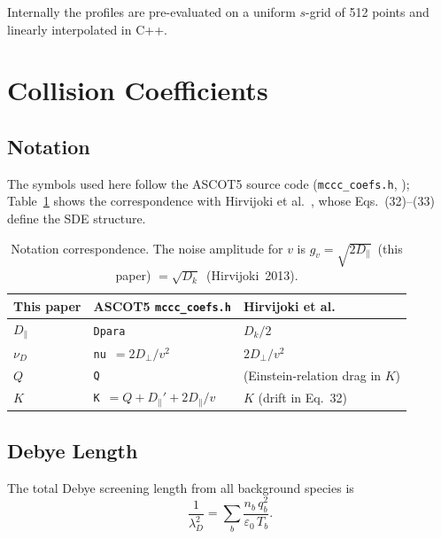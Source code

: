 \documentclass[11pt]{article}
\newcommand{\lambdaD}{\lambda_D}
\newcommand{\eps}{\varepsilon_0}
\begin{document}
Internally the profiles are pre-evaluated on a uniform $s$-grid of 512 points and
linearly interpolated in C++.

\section{Collision Coefficients}
\label{sec:coefs}

\subsection*{Notation}

The symbols used here follow the ASCOT5 source code (\texttt{mccc\_coefs.h},
\cite{ascot5code}); Table~\ref{tab:notation} shows the correspondence with
Hirvijoki et al.\ \cite{hirvijoki2013}, whose Eqs.~(32)--(33) define the
SDE structure.

\begin{table}[h]
\centering
\begin{tabular}{lll}
\hline
This paper & ASCOT5 \texttt{mccc\_coefs.h} & Hirvijoki et al.\ \cite{hirvijoki2013} \\
\hline
$D_{\parallel}$   & \texttt{Dpara}  & $D_k/2$ \\
$\nu_D$           & \texttt{nu}~$= 2D_\perp/v^2$ & $2D_\perp/v^2$ \\
$Q$               & \texttt{Q}      & (Einstein-relation drag in $K$) \\
$K$               & \texttt{K}~$= Q + D_\parallel' + 2D_\parallel/v$ & $K$ (drift in Eq.~32) \\
\hline
\end{tabular}
\caption{Notation correspondence. The noise amplitude for $v$ is
$g_v = \sqrt{2D_\parallel}$~(this paper) $= \sqrt{D_k}$~(Hirvijoki~2013).}
\label{tab:notation}
\end{table}

\subsection{Debye Length}

The total Debye screening length from all background species is \cite{spitzer1962,nrl}
\begin{equation}
  \frac{1}{\lambdaD^2}
  = \sum_b \frac{n_b\,q_b^2}{\eps\,T_b}.
  \label{eq:debye}
\end{equation}
\end{document}
